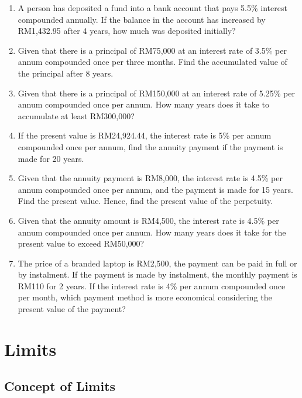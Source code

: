 \documentclass[12pt]{report}
\begin{document}
\begin{multicols}{2}
\begin{enumerate}
    \item A person has deposited a fund into a bank account that pays 5.5\% interest
          compounded annually. If the balance in the account has increased by RM1,432.95
          after 4 years, how much was deposited initially?

    \item Given that there is a principal of RM75,000 at an interest rate of 3.5\% per
          annum compounded once per three months. Find the accumulated value of the
          principal after 8 years.

    \item Given that there is a principal of RM150,000 at an interest rate of 5.25\% per
          annum compounded once per annum. How many years does it take to accumulate at
          least RM300,000?

    \item If the present value is RM24,924.44, the interest rate is 5\% per annum
          compounded once per annum, find the annuity payment if the payment is made for
          20 years.

    \item Given that the annuity payment is RM8,000, the interest rate is 4.5\% per annum
          compounded once per annum, and the payment is made for 15 years. Find the
          present value. Hence, find the present value of the perpetuity.

    \item Given that the annuity amount is RM4,500, the interest rate is 4.5\% per annum
          compounded once per annum. How many years does it take for the present value to
          exceed RM50,000?

    \item The price of a branded laptop is RM2,500, the payment can be paid in full or by
          instalment. If the payment is made by instalment, the monthly payment is RM110
          for 2 years. If the interest rate is 4\% per annum compounded once per month,
          which payment method is more economical considering the present value of the
          payment?
  \end{enumerate}
\end{multicols}

\chapter{Limits}

\section{Concept of Limits}
\end{document}
